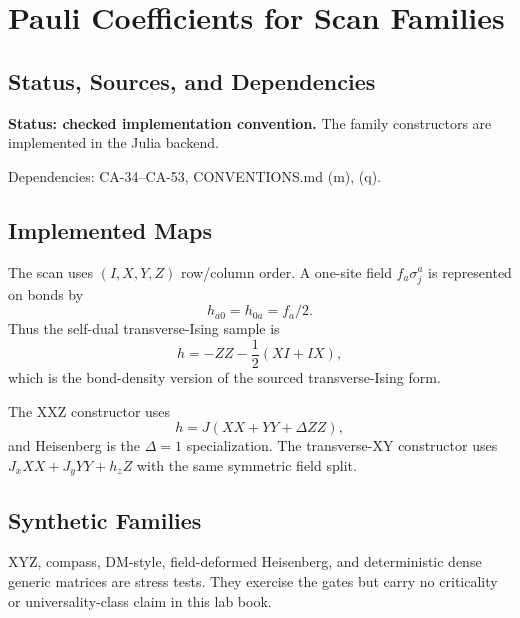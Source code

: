
\section{Pauli Coefficients for Scan Families}
\label{sec:qubit-hamiltonian-family-conventions}

\subsection{Status, Sources, and Dependencies}

\textbf{Status: checked implementation convention.}  The family constructors
are implemented in the Julia backend.

Dependencies: CA-34--CA-53, CONVENTIONS.md (m), (q).


\subsection{Implemented Maps}

The scan uses \((I,X,Y,Z)\) row/column order.  A one-site field
\(f_a\sigma^a_j\) is represented on bonds by
\[
  h_{a0}=h_{0a}=f_a/2.
\]
Thus the self-dual transverse-Ising sample is
\[
  h=-ZZ-\frac12(XI+IX),
\]
which is the bond-density version of the sourced transverse-Ising form.

The XXZ constructor uses
\[
  h=J(XX+YY+\Delta ZZ),
\]
and Heisenberg is the \(\Delta=1\) specialization.  The transverse-XY
constructor uses \(J_xXX+J_yYY+h_zZ\) with the same symmetric field split.

\subsection{Synthetic Families}

XYZ, compass, DM-style, field-deformed Heisenberg, and deterministic dense
generic matrices are stress tests.  They exercise the gates but carry no
criticality or universality-class claim in this lab book.
